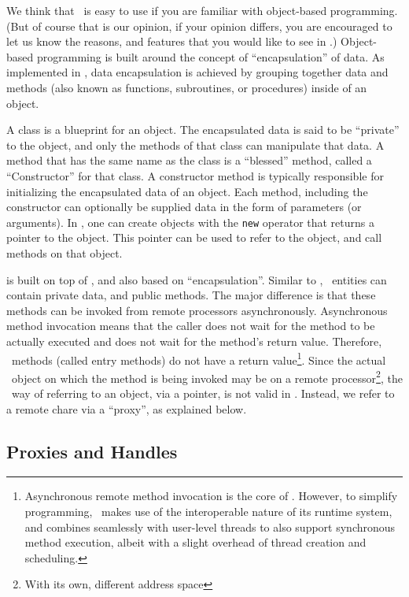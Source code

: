 We think that \charmpp\ is easy to use if you are familiar with object-based
programming. (But of course that is our opinion, if your opinion differs,
you are encouraged to let us know the reasons, and features that you would
like to see in \charmpp.) Object-based programming is built around the
concept of ``encapsulation'' of data. As implemented in \CC, data
encapsulation is achieved by grouping together data and methods (also known
as functions, subroutines, or procedures) inside of an object.

A class is a blueprint for an object.  The encapsulated data is said to be
``private'' to the object, and only the methods of that class can manipulate
that data. A method that has the same name as the class is a ``blessed''
method, called a ``Constructor'' for that class.  A constructor method is
typically responsible for initializing the encapsulated data of an object.
Each method, including the constructor can optionally be supplied data in
the form of parameters (or arguments). In \CC, one can create objects with
the {\tt new} operator that returns a pointer to the object. This pointer
can be used to refer to the object, and call methods on that object.

\charmpp{} is built on top of \CC, and also based on ``encapsulation''.
Similar to \CC, \charmpp\ entities can contain private data, and public
methods. The major difference is that these methods can be invoked from
remote processors asynchronously.  Asynchronous method invocation means that
the caller does not wait for the method to be actually executed and does not
wait for the method's return value. Therefore, \charmpp\ methods (called
entry methods) do not have a return value\footnote{Asynchronous remote
method invocation is the core of \charmpp. However, to simplify programming,
\charmpp\ makes use of the interoperable nature of its runtime system, and
combines seamlessly with user-level threads to also support synchronous
method execution, albeit with a slight overhead of thread creation and
scheduling.}. Since the actual \charmpp\ object on which the method is being
invoked may be on a remote processor\footnote{With its own, different address
space}, the \CC\ way of referring to an object, via a pointer, is not valid
in \charmpp.  Instead, we refer to a remote chare via a ``proxy'',
as explained below.

\subsection{Proxies and Handles}
\label{proxies}

